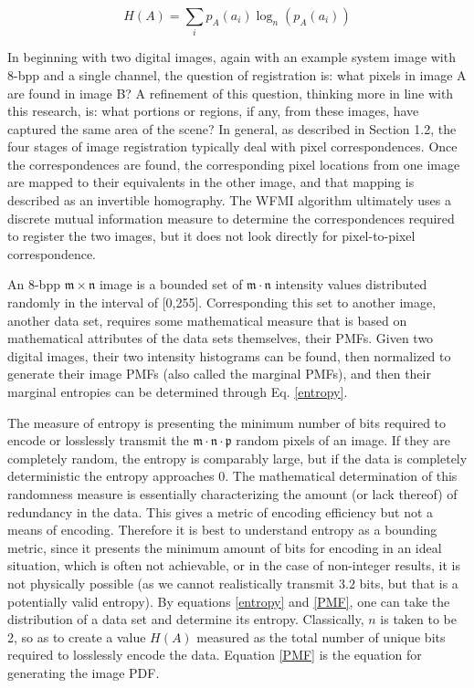 \begin{equation}
\label{entropy}
	H(A) = \sum_{i}{p_{A}(a_{i}) \log_{n}{\left(p_{A}(a_{i})\right)}}
\end{equation}

In beginning with two digital images, again with an example system image with 8-bpp and a single channel, the question of registration is: what pixels in image A are found in image B? A refinement of this question, thinking more in line with this research, is: what portions or regions, if any, from these images, have captured the same area of the scene? In general, as described in Section 1.2, the four stages of image registration typically deal with pixel correspondences. Once the correspondences are found, the corresponding pixel locations from one image are mapped to their equivalents in the other image, and that mapping is described as an invertible homography. The WFMI algorithm ultimately uses a discrete mutual information measure to determine the correspondences required to register the two images, but it does not look directly for pixel-to-pixel correspondence.

An 8-bpp $\mathfrak{m} \times \mathfrak{n}$ image is a bounded  set of $\mathfrak{m} \cdot \mathfrak{n}$ intensity values distributed randomly in the interval of [0,255]. Corresponding this set to another image, \ie{ }another data set, requires some mathematical measure that is based on mathematical attributes of the data sets themselves, \ie{ }their PMFs. Given two digital images, their two intensity histograms can be found, then normalized to generate their image PMFs (also called the marginal PMFs), and then their marginal entropies can be determined through Eq. \ref{entropy}.

The measure of entropy is presenting the minimum number of bits required to encode or losslessly transmit the $\mathfrak{m} \cdot \mathfrak{n} \cdot \mathfrak{p}$ random pixels of an image. If they are completely random, the entropy is comparably large, but if the data is completely deterministic the entropy approaches 0. The mathematical determination of this randomness measure is essentially characterizing the amount (or lack thereof) of redundancy in the data. This gives a metric of encoding efficiency but not a means of encoding. Therefore it is best to understand entropy as a bounding metric, since it presents the minimum amount of bits for encoding in an ideal situation, which is often not achievable, or in the case of non-integer results, it is not physically possible (as we cannot realistically transmit $3.2$ bits, but that is a potentially valid entropy). By equations \ref{entropy} and \ref{PMF}, one can take the distribution of a data set and determine its entropy. Classically, $n$ is taken to be 2, so as to create a value $H(A)$ measured as the total number of unique bits required to losslessly encode the data. Equation \ref{PMF} is the equation for generating the image PDF.

